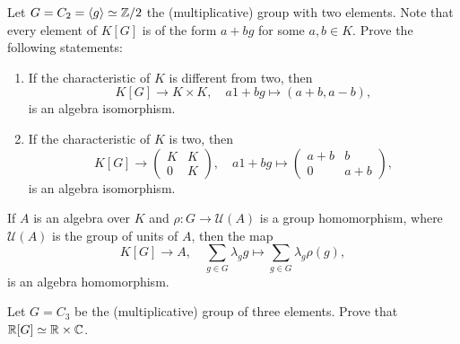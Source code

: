 
\begin{exercise}
	Let $G=C_2=\langle g\rangle\simeq\mathbb{Z}/2$ the (multiplicative) 
	group with two elements. Note that every element of $K[G]$ is of the form
	$a+bg$ for some $a,b\in K$. Prove the following statements:
	\begin{enumerate}
	    \item If the characteristic of $K$ is different from two, then 
	    \[
		K[G]\to K\times K,
		\quad
		a1+bg\mapsto (a+b,a-b),
	\]
	is an algebra isomorphism. 
	\item If the characteristic of $K$ is two, then 
	\[
	K[G]\to \begin{pmatrix}
			K & K\\
			0 & K
		\end{pmatrix},
		\quad
		a1+bg\mapsto\begin{pmatrix}
			a+b & b\\
			0 & a+b
		\end{pmatrix},
	\]
	is an algebra isomorphism. 
	\end{enumerate}
\end{exercise}

If $A$ is an algebra over $K$ and $\rho\colon G\to \mathcal{U}(A)$
is a group homomorphism, where $\mathcal{U}(A)$ is the group of units of $A$, then 
the map \[
	K[G]\to A,\quad 
\sum_{g\in G}\lambda_gg\mapsto\sum_{g\in G}\lambda_g\rho(g),
\]
is an algebra homomorphism. 

\begin{exercise}
	Let $G=C_3$ be the (multiplicative) group of three elements. Prove that
	$\mathbb{R}[G]\simeq\mathbb{R}\times\mathbb{C}$.
\end{exercise}

